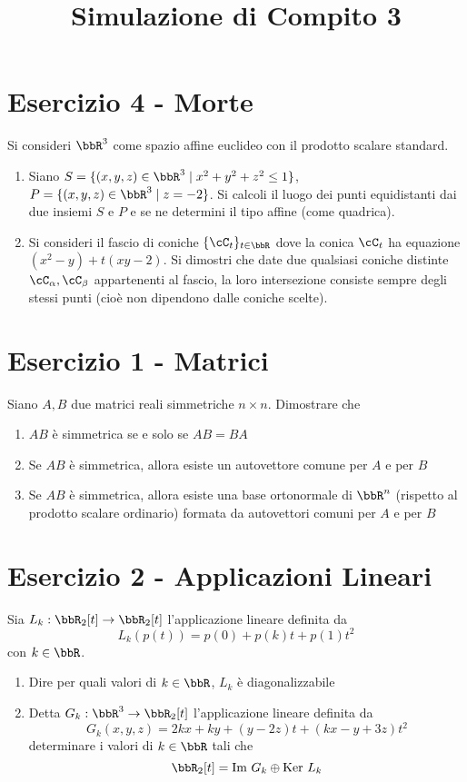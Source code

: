 \documentclass[a4paper,NoNotes,GeneralMath]{stdmdoc}
\begin{document}
	\section*{Esercizio 4 - Morte}
	Si consideri $\bbR^3$ come spazio affine euclideo con il prodotto scalare standard.
	\begin{enumerate}
		\item Siano $S = \{ (x, y, z) \in \bbR^3 \mid x^2 + y^2 + z^2 \le 1 \}$, $P = \{ (x,y,z) \in\bbR^3 \mid z = -2 \}$. Si calcoli il luogo dei punti equidistanti dai due insiemi $S$ e $P$ e se ne determini il tipo affine (come quadrica).
		\item Si consideri il fascio di coniche $\{\cC_t\}_{t\in\bbR}$ dove la conica $\cC_t$ ha equazione $(x^2 - y) + t(xy - 2)$. Si dimostri che date due qualsiasi coniche distinte $\cC_\alpha, \cC_\beta$ appartenenti al fascio, la loro intersezione consiste sempre degli stessi punti (cioè non dipendono dalle coniche scelte).
	\end{enumerate}

	\newpage
	\title{Simulazione di Compito 3}
	\section*{Esercizio 1 - Matrici}
	Siano $A, B$ due matrici reali simmetriche $n \times n$. Dimostrare che
	\begin{enumerate}
		\item $AB$ è simmetrica se e solo se $AB = BA$
		\item Se $AB$ è simmetrica, allora esiste un autovettore comune per $A$ e per $B$
		\item Se $AB$ è simmetrica, allora esiste una base ortonormale di $\bbR^n$ (rispetto al prodotto scalare ordinario) formata da autovettori comuni per $A$ e per $B$
	\end{enumerate}

	\section*{Esercizio 2 - Applicazioni Lineari}
	Sia $L_k : \bbR_2[t] \rar \bbR_2[t]$ l'applicazione lineare definita da $$ L_k(p(t)) = p(0) + p(k)t + p(1)t^2 $$ con $k\in\bbR$.
	\begin{enumerate}
		\item Dire per quali valori di $k\in\bbR$, $L_k$ è diagonalizzabile
		\item Detta $G_k: \bbR^3 \rar \bbR_2[t]$ l'applicazione lineare definita da $$G_k(x,y,z) = 2kx + ky + (y-2z)t+(kx-y+3z)t^2$$ determinare i valori di $k\in\bbR$ tali che $$ \bbR_2[t] = \Img G_k \oplus \Ker L_k $$
	\end{enumerate}
\end{document}
